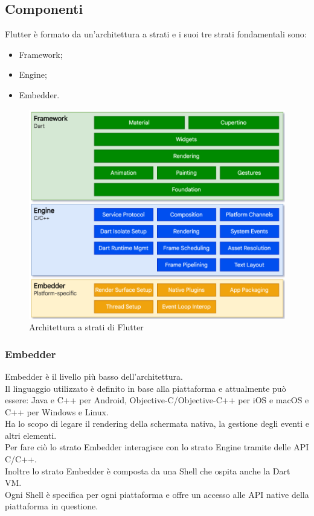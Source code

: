 \subsection{Componenti}
Flutter è formato da un'architettura a strati \cite{flutterdettagli, flutterd} e i suoi tre strati fondamentali sono:
\begin{itemize}
	\item Framework; 
	\item Engine;  
	\item Embedder.\\
\end{itemize}
\begin{figure}[htbp]	
	\centering
	\includegraphics[width=13cm]{immagini/composizione.png}
	\caption{Architettura a strati di Flutter}
	\label{fig:Architettura a strati di Flutter}
\end{figure}

\newpage

\subsubsection{Embedder}
Embedder è il livello più basso dell'architettura.\\
Il linguaggio utilizzato è definito in base alla piattaforma e attualmente può essere: Java e C++ per Android, Objective-C/Objective-C++ per iOS e macOS e C++ per Windows e Linux.\\
Ha lo scopo di legare il rendering della schermata nativa, la gestione degli eventi e altri elementi.\\
Per fare ciò lo strato Embedder interagisce con lo strato Engine tramite delle API C/C++.\\
Inoltre lo strato Embedder è composta da una Shell che ospita anche la Dart VM.		\\
Ogni Shell è specifica per ogni piattaforma e offre un accesso alle API native della piattaforma in questione.

